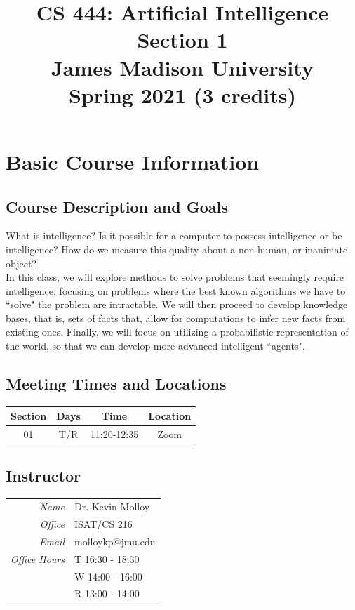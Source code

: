 \documentclass[11pt]{article}
\title{CS 444: Artificial Intelligence \\ Section 1 \\ James Madison University \\ Spring 2021 (3 credits)}
\date{\vspace{-5ex}}
\begin{document}
\maketitle

\section{Basic Course Information}
                                        
\subsection{Course Description and Goals}
What is intelligence?  Is it possible for a computer to possess intelligence or be intelligence?  How do we measure this quality about a non-human, or
inanimate object? \\

In this class, we will explore methods to solve problems that seemingly require intelligence, focusing on problems where the best known algorithms
we have to ``solve" the problem are intractable.  We will then proceed to develop knowledge bases, that is, sets of facts that, allow for computations
to infer new facts from existing ones.  Finally, we will focus on utilizing a probabilistic representation of the world, so that we can develop
more advanced intelligent ``agents".
 
\subsection{Meeting Times and Locations}
\begin{center}
\begin{tabular}{cccc}
Section & Days & Time &  Location\\
\hline
01 & T/R & 11:20-12:35  & Zoom \\
\end{tabular}
\end{center}

\subsection{Instructor}
\label{instructor}
\begin{center}
\begin{tabular}{rl}
\emph{Name} & Dr. Kevin Molloy\\
\emph{Office} & ISAT/CS  216\\
\emph{Email} & molloykp@jmu.edu\\
\emph{Office Hours} & T 16:30 - 18:30 \\
                                 & W  14:00 - 16:00 \\
                                 & R 13:00 - 14:00 \\
\end{tabular}
\end{center}
\end{document}
